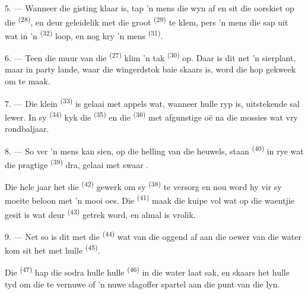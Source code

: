 5. --- Wanneer die gisting klaar is, tap 'n mens die wyn af en sit die oorskiet op die
 \textsuperscript{(28)}, en deur geleidelik met die groot 
\textsuperscript{(29)} te klem, pers 'n mens die sap uit wat in 'n 
\textsuperscript{(32)} loop, en nog kry 'n mens  \textsuperscript{(31)}.

\VUsaut{6.0mm}
\VUsaut{3.4mm}

6. --- Teen die muur van die  \textsuperscript{(27)} klim 'n tak
 \textsuperscript{(30)} op. Daar is dit net 'n sierplant, maar in party lande,
waar die wingerdstok baie skaars is, word die hop gekweek om  te maak.

7. --- Die klein  \textsuperscript{(33)} is gelaai met appels wat,
wanneer hulle ryp is, uitstekende  sal lewer. In sy 
\textsuperscript{(34)} kyk die  \textsuperscript{(35)} en die
 \textsuperscript{(36)} met afgunstige oë na die mossies wat vry
rondbaljaar.

8. --- So ver 'n mens kan sien, op die helling van die heuwels, staan
 \textsuperscript{(40)} in rye wat die pragtige
 \textsuperscript{(39)} dra, gelaai met swaar .

Die hele jaar het die  \textsuperscript{(42)} gewerk om sy
 \textsuperscript{(38)} te versorg en nou word hy vir sy moeite beloon
met 'n mooi oes. Die  \textsuperscript{(41)} maak die kuipe
vol wat op die waentjie gesit is wat deur  \textsuperscript{(43)} getrek
word, en almal is vrolik.

\VUsaut{5.0mm}
\VUsaut{3.4mm}

9. --- Net so is dit met die  \textsuperscript{(44)} wat van die
oggend af aan die oewer van die water kom sit het met hulle 
\textsuperscript{(45)}.

Die  \textsuperscript{(47)} hap die  sodra hulle hulle
 \textsuperscript{(46)} in die water laat sak, en skaars het hulle tyd om die
 te vernuwe of 'n nuwe slagoffer spartel aan die punt van die lyn.

